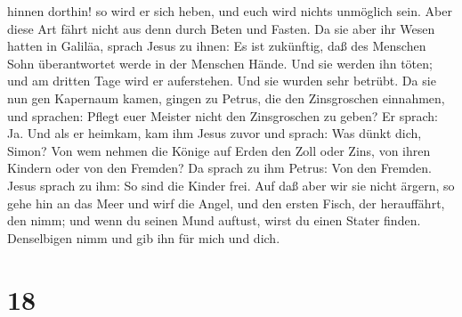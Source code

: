 hinnen dorthin! so wird er sich heben, und euch wird nichts unmöglich
sein.  Aber diese Art fährt nicht aus denn durch Beten und
Fasten.  Da sie aber ihr Wesen hatten in Galiläa, sprach
Jesus zu ihnen: Es ist zukünftig, daß des Menschen Sohn überantwortet
werde in der Menschen Hände.  Und sie werden ihn töten; und
am dritten Tage wird er auferstehen. Und sie wurden sehr betrübt.
 Da sie nun gen Kapernaum kamen, gingen zu Petrus, die den
Zinsgroschen einnahmen, und sprachen: Pflegt euer Meister nicht den
Zinsgroschen zu geben?  Er sprach: Ja. Und als er heimkam,
kam ihm Jesus zuvor und sprach: Was dünkt dich, Simon? Von wem nehmen
die Könige auf Erden den Zoll oder Zins, von ihren Kindern oder von den
Fremden?  Da sprach zu ihm Petrus: Von den Fremden. Jesus
sprach zu ihm: So sind die Kinder frei.  Auf daß aber wir
sie nicht ärgern, so gehe hin an das Meer und wirf die Angel, und den
ersten Fisch, der herauffährt, den nimm; und wenn du seinen Mund
auftust, wirst du einen Stater finden. Denselbigen nimm und gib ihn für
mich und dich.

\hypertarget{section-17}{%
\section{18}\label{section-17}}

